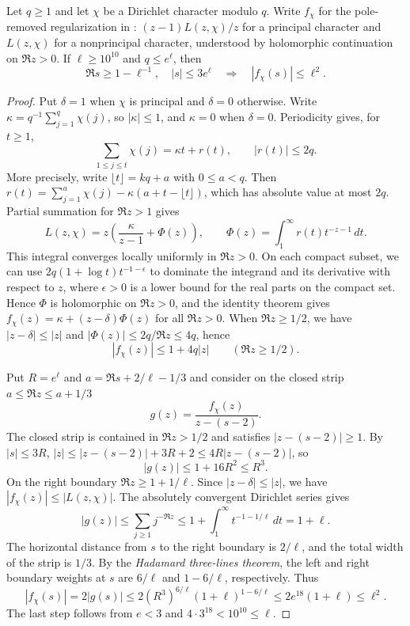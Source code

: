 \begin{lemma}
\label{lem:regular-l-growth}
\emitthmsource
Let $q\ge1$ and let $\chi$ be a Dirichlet character modulo $q$. Write $f_\chi$ for the pole-removed regularization in : $(z-1)L(z,\chi)/z$ for a principal character and $L(z,\chi)$ for a nonprincipal character, understood by holomorphic continuation on $\Re z>0$. If $\ell\ge10^{10}$ and $q\le e^\ell$, then
\[
 \Re s\ge 1-\ell^{-1},\quad |s|\le3e^\ell
 \quad\Longrightarrow\quad |f_\chi(s)|\le\ell^2.
\]
\end{lemma}

\begin{proof}
Put $\delta=1$ when $\chi$ is principal and $\delta=0$ otherwise. Write $\kappa=q^{-1}\sum_{j=1}^q\chi(j)$, so $|\kappa|\le1$, and $\kappa=0$ when $\delta=0$. Periodicity gives, for $t\ge1$,
\[
 \sum_{1\le j\le t}\chi(j)=\kappa t+r(t),\qquad |r(t)|\le2q .
\]
More precisely, write $\lfloor t\rfloor=kq+a$ with $0\le a<q$. Then
$r(t)=\sum_{j=1}^a\chi(j)-\kappa(a+t-\lfloor t\rfloor)$, which has absolute value at most $2q$.
Partial summation for $\Re z>1$ gives
\[
 L(z,\chi)
 =z\left(\frac{\kappa}{z-1}+\Phi(z)\right),
 \qquad
 \Phi(z)=\int_1^\infty r(t)t^{-z-1}\,dt .
\]
This integral converges locally uniformly in $\Re z>0$. On each compact subset, we can use
$2q(1+\log t)t^{-1-\epsilon}$ to dominate the integrand and its derivative with respect to $z$, where $\epsilon>0$ is a lower bound for the real parts on the compact set.
Hence $\Phi$ is holomorphic on $\Re z>0$, and the identity theorem gives $f_\chi(z)=\kappa+(z-\delta)\Phi(z)$ for all $\Re z>0$. When $\Re z\ge1/2$, we have $|z-\delta|\le|z|$ and
$|\Phi(z)|\le2q/\Re z\le4q$, hence
\[
 |f_\chi(z)|\le 1+4q|z| \qquad (\Re z\ge1/2).
\]

Put $R=e^\ell$ and $a=\Re s+2/\ell-1/3$ and consider on the closed strip $a\le\Re z\le a+1/3$
\[
 g(z)=\frac{f_\chi(z)}{z-(s-2)}.
\]
The closed strip is contained in $\Re z>1/2$ and satisfies $|z-(s-2)|\ge1$. By $|s|\le3R$,
$|z|\le |z-(s-2)|+3R+2\le 4R|z-(s-2)|$, so
\[
 |g(z)|\le1+16R^2\le R^3.
\]
On the right boundary $\Re z\ge1+1/\ell$. Since $|z-\delta|\le|z|$, we have $|f_\chi(z)|\le |L(z,\chi)|$. The absolutely convergent Dirichlet series gives
\[
 |g(z)|\le\sum_{j\ge1} j^{-\Re z}
   \le 1+\int_1^\infty t^{-1-1/\ell}\,dt=1+\ell .
\]
The horizontal distance from $s$ to the right boundary is $2/\ell$, and the total width of the strip is $1/3$. By the \emph{Hadamard three-lines theorem}, the left and right boundary weights at $s$ are $6/\ell$ and $1-6/\ell$, respectively. Thus
\[
 |f_\chi(s)|=2|g(s)|
 \le 2(R^3)^{6/\ell}(1+\ell)^{1-6/\ell}
 \le 2e^{18}(1+\ell)\le\ell^2.
\]
The last step follows from $e<3$ and $4\cdot3^{18}<10^{10}\le\ell$.
\end{proof}

